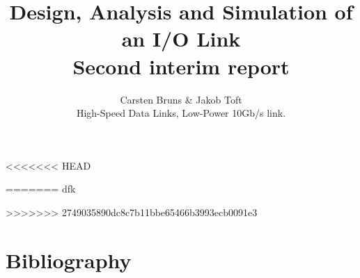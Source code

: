 \documentclass[12pt,journal,compsoc,onecolumn]{IEEEtran}
\begin{document}
%
\title{Design, Analysis and Simulation of an I/O Link\\Second interim report}

\author{Carsten Bruns
        \& Jakob Toft%



\begin{IEEEkeywords}
High-Speed Data Links, Low-Power 10Gb/s link.
\end{IEEEkeywords}}


\maketitle

\IEEEdisplaynotcompsoctitleabstractindextext
\IEEEpeerreviewmaketitle

<<<<<<< HEAD












=======
dfk\cite{rajesh2011a} %
%


>>>>>>> 2749035890dc8c7b11bbe65466b3993ecb0091e3
%



\ifCLASSOPTIONcaptionsoff
  \newpage
\fi

\newpage
\section{Bibliography}
{}

\end{document}
